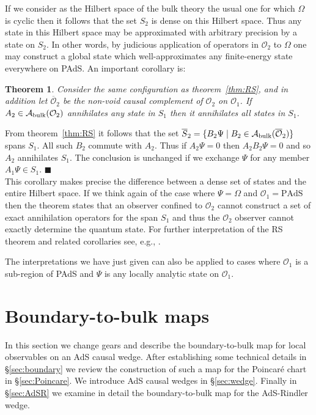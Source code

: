 \documentclass[12pt]{article}
\numberwithin{equation}{section}
\newtheorem{theorem}{Theorem}[section]
\def\proof{\noindent{\em Proof.~}}
\def\cO{{\mathcal{O}}}
\def\cAbulk{{\mathcal{A}_{\rm bulk}}}
\begin{document}
If we consider as the Hilbert space of the bulk theory the usual
one for which $\Omega$ is cyclic then it follows that the set
$S_2$ is dense on this Hilbert space. Thus any state in this
Hilbert space may be approximated
with arbitrary precision by a state on $S_2$.
In other words, by judicious application of operators in $\cO_2$
to $\Omega$ one may construct a global state which well-approximates 
any finite-energy state everywhere on PAdS. 
An important corollary is:
\begin{theorem} \label{thm:RSc}
  Consider the same configuration as theorem~\ref{thm:RS}, and
  in addition let $\overline{\cO}_2$ be the non-void causal complement
  of $\cO_2$ on $\cO_1$.
  If $A_2 \in \cAbulk(\cO_2)$ annihilates any state in $S_1$ then
  it annihilates all states in $S_1$. 
\end{theorem}
\proof From theorem~\ref{thm:RS} it follows that the set
$\overline{S}_2 = \{ B_2 \Psi \; | \; 
B_2 \in \cAbulk(\overline{\cO}_2) \}$
spans $S_1$. All such $B_2$ commute with $A_2$. Thus if $A_2\Psi = 0$ 
then $A_2 B_2 \Psi = 0$ and so $A_2$ annihilates $S_1$. 
The conclusion is unchanged if we exchange $\Psi$ for any member $A_1 \Psi
 \in S_1$. $\blacksquare$
\vspace{8pt}\\
This corollary makes precise the difference between 
a dense set of states and the entire Hilbert space.
If we think again of the case where $\Psi = \Omega$ and $\cO_1 = \text{PAdS}$
then the theorem states that an observer confined
to $\cO_2$ cannot construct a set of exact annihilation operators
for the span $S_1$ and thus the $\cO_2$ observer cannot exactly
determine the quantum state. For further interpretation of the
RS theorem and related corollaries see, e.g., 
\cite{Haag:1992aa,Streater:1989vi}.


The interpretations we have just given can also be applied to 
cases where $\cO_1$ is a sub-region of PAdS and $\Psi$ is any
locally analytic state on $\cO_1$. 


\section{Boundary-to-bulk maps}
\label{sec:b2b}


In this section we change gears and describe the boundary-to-bulk
map for local observables on an AdS causal wedge. After establishing
some technical details in \S\ref{sec:boundary} we review the construction
of such a map for the Poincar\'e chart in \S\ref{sec:Poincare}. We introduce
AdS causal wedges in \S\ref{sec:wedge}. Finally in \S\ref{sec:AdSR} we
examine in detail the boundary-to-bulk map for the AdS-Rindler wedge.
\end{document}

